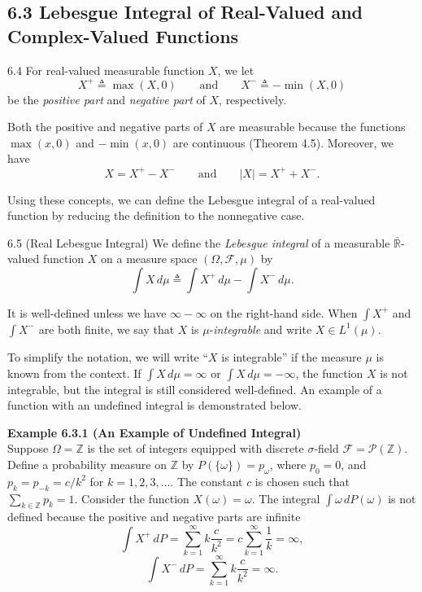 \subsection*{6.3 Lebesgue Integral of Real-Valued and Complex-Valued Functions}

\begin{defbox}{6.4}
For real-valued measurable function $X$, we let
\[
X^+ \triangleq \max(X,0)
\qquad \text{and} \qquad
X^- \triangleq -\min(X,0)
\]
be the \textit{positive part} and \textit{negative part} of $X$, respectively.

Both the positive and negative parts of $X$ are measurable because the functions $\max(x,0)$ and $-\min(x,0)$ are continuous (Theorem 4.5). Moreover, we have
\[
X=X^+-X^-
\qquad \text{and} \qquad
|X|=X^+ + X^-.
\]

Using these concepts, we can define the Lebesgue integral of a real-valued function by reducing the definition to the nonnegative case.
\end{defbox}

\begin{defbox}{6.5 (Real Lebesgue Integral)}
We define the \textit{Lebesgue integral} of a measurable $\bar{\mathbb{R}}$-valued function $X$ on a measure space $(\Omega,\mathcal{F},\mu)$ by
\[
\int X\, d\mu \triangleq \int X^+\, d\mu - \int X^-\, d\mu.
\]

It is well-defined unless we have $\infty-\infty$ on the right-hand side. When $\int X^+$ and $\int X^-$ are both finite, we say that $X$ is $\mu$-\textit{integrable} and write $X \in L^1(\mu)$.
\end{defbox}

To simplify the notation, we will write ``$X$ is integrable'' if the measure $\mu$ is known from the context. If $\int X\, d\mu = \infty$ or $\int X\, d\mu = -\infty$, the function $X$ is not integrable, but the integral is still considered well-defined. An example of a function with an undefined integral is demonstrated below.

\textbf{Example 6.3.1 (An Example of Undefined Integral)} \\
Suppose $\Omega=\mathbb{Z}$ is the set of integers equipped with discrete $\sigma$-field $\mathcal{F}=\mathcal{P}(\mathbb{Z})$. Define a probability measure on $\mathbb{Z}$ by $P(\{\omega\})=p_{\omega}$, where $p_0=0$, and $p_k=p_{-k}=c/k^2$ for $k=1,2,3,\dots$. The constant $c$ is chosen such that $\sum_{k\in\mathbb{Z}} p_k =1$. Consider the function $X(\omega)=\omega$. The integral $\int \omega\, dP(\omega)$ is not defined because the positive and negative parts are infinite
\[
\int X^+\, dP = \sum_{k=1}^{\infty} k \frac{c}{k^2}
= c\sum_{k=1}^{\infty} \frac{1}{k}
= \infty,
\]
\[
\int X^-\, dP = \sum_{k=1}^{\infty} k \frac{c}{k^2}
= \infty.
\]

